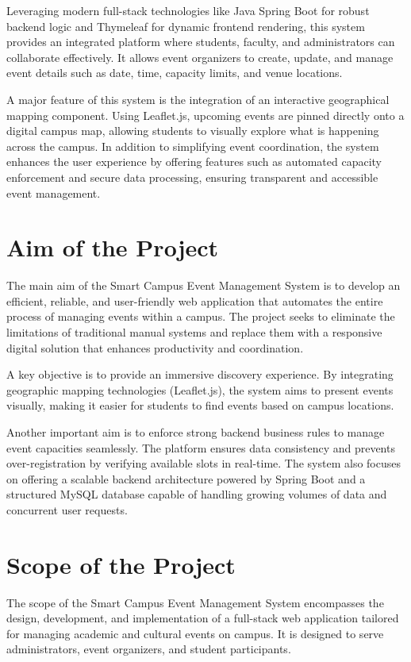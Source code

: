 \documentclass[10pt]{report}
\begin{document}
Leveraging modern full-stack technologies like Java Spring Boot for robust backend logic and Thymeleaf for dynamic frontend rendering, this system provides an integrated platform where students, faculty, and administrators can collaborate effectively. It allows event organizers to create, update, and manage event details such as date, time, capacity limits, and venue locations.

A major feature of this system is the integration of an interactive geographical mapping component. Using Leaflet.js, upcoming events are pinned directly onto a digital campus map, allowing students to visually explore what is happening across the campus. In addition to simplifying event coordination, the system enhances the user experience by offering features such as automated capacity enforcement and secure data processing, ensuring transparent and accessible event management.
\linespread{1.5} 
\section{Aim of the Project} 
The main aim of the Smart Campus Event Management System is to develop an efficient, reliable, and user-friendly web application that automates the entire process of managing events within a campus. The project seeks to eliminate the limitations of traditional manual systems and replace them with a responsive digital solution that enhances productivity and coordination.

A key objective is to provide an immersive discovery experience. By integrating geographic mapping technologies (Leaflet.js), the system aims to present events visually, making it easier for students to find events based on campus locations. 

Another important aim is to enforce strong backend business rules to manage event capacities seamlessly. The platform ensures data consistency and prevents over-registration by verifying available slots in real-time. The system also focuses on offering a scalable backend architecture powered by Spring Boot and a structured MySQL database capable of handling growing volumes of data and concurrent user requests.

\section{Scope of the Project} 
The scope of the Smart Campus Event Management System encompasses the design, development, and implementation of a full-stack web application tailored for managing academic and cultural events on campus. It is designed to serve administrators, event organizers, and student participants.
\end{document}
